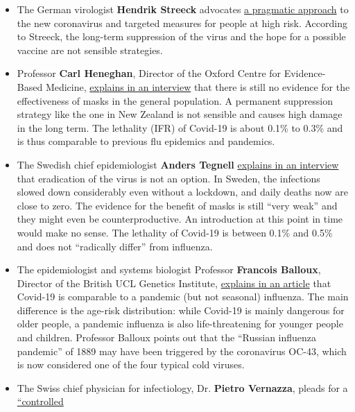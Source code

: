 \begin{itemize}
\tightlist
\item
  The German virologist \textbf{Hendrik Streeck} advocates
  \href{https://www.merkur.de/welt/coronavirus-zweite-welle-impfstoff-streeck-virologe-warnung-drosten-massentest-infektion-zr-13834907.html}{a
  pragmatic approach} to the new coronavirus and targeted measures for
  people at high risk. According to Streeck, the long-term suppression
  of the virus and the hope for a possible vaccine are not sensible
  strategies.
\item
  Professor \textbf{Carl Heneghan}, Director of the Oxford Centre for
  Evidence-Based Medicine,
  \href{https://www.youtube.com/watch?v=Z3plSbCbkSA}{explains in an
  interview} that there is still no evidence for the effectiveness of
  masks in the general population. A permanent suppression strategy like
  the one in New Zealand is not sensible and causes high damage in the
  long term. The lethality (IFR) of Covid-19 is about 0.1\% to 0.3\% and
  is thus comparable to previous flu epidemics and pandemics.
\item
  The Swedish chief epidemiologist \textbf{Anders Tegnell}
  \href{https://www.youtube.com/watch?v=xh9wso6bEAc}{explains in an
  interview} that eradication of the virus is not an option. In Sweden,
  the infections slowed down considerably even without a lockdown, and
  daily deaths now are close to zero. The evidence for the benefit of
  masks is still ``very weak'' and they might even be counterproductive.
  An introduction at this point in time would make no sense. The
  lethality of Covid-19 is between 0.1\% and 0.5\% and does not
  ``radically differ'' from influenza.
\item
  The epidemiologist and systems biologist Professor \textbf{Francois
  Balloux}, Director of the British UCL Genetics Institute,
  \href{https://twitter.com/BallouxFrancois/status/1284513419454971905}{explains
  in an article} that Covid-19 is comparable to a pandemic (but not
  seasonal) influenza. The main difference is the age-risk distribution:
  while Covid-19 is mainly dangerous for older people, a pandemic
  influenza is also life-threatening for younger people and children.
  Professor Balloux points out that the ``Russian influenza pandemic''
  of 1889 may have been triggered by the coronavirus OC-43, which is now
  considered one of the four typical cold viruses.
\item
  The Swiss chief physician for infectiology, Dr. \textbf{Pietro
  Vernazza}, pleads for a
  \href{https://corona-transition.org/der-infektiologe-prof-pietro-vernazza-sieht-covid-19-im-bereich-einer}{``controlled
}
\end{itemize}
